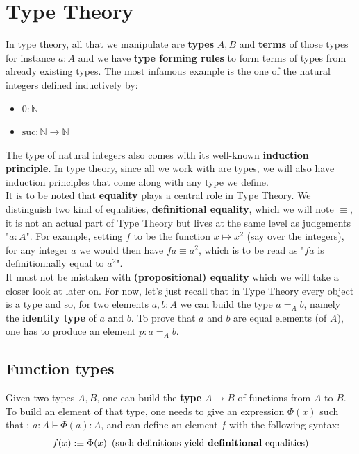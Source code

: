 \documentclass{report}
\begin{document}
\section{Type Theory}
In type theory, all that we manipulate are \textbf{types} $A,B$ and \textbf{terms} of those types for instance $a : A$ and we have \textbf{type forming rules} to form terms of types from already existing types. The most infamous example is the one of the natural integers defined inductively by:
\begin{itemize}
    \item $0 : \mathbb N$
    \item $\mathrm{suc}: \mathbb N \rightarrow \mathbb N$
\end{itemize}
The type of natural integers also comes with its well-known \textbf{induction principle}. In type theory, since all we work with are types, we will also have induction principles that come along with any type we define.\\
It is to be noted that \textbf{equality} plays a central role in Type Theory. We distinguish two kind of equalities, \textbf{definitional equality}, which we will note $\equiv$, it is not an actual part of Type Theory but lives at the same level as judgements "$a : A $". For example, setting $f$ to be the function $x \mapsto x^2 $ (say over the integers), for any integer $a$ we would then have $f a \equiv a^2$, which is to be read as "$f a$ is definitionnally equal to $a^2$".\\
It must not be mistaken with \textbf{(propositional) equality} which we will take a closer look at later on. For now, let's just recall that in Type Theory every object is a type and so, for two elements $a,b :A$ we can build the type $a =_A b$, namely the \textbf{identity type} of $a$ and $b$. To prove that $a$ and $b$ are equal elements (of $A$), one has to produce an element $p : a=_A b$.
\subsection{Function types}
Given two types $A,B$, one can build the \textbf{type} $A \rightarrow B$ of functions from $A$ to $B$. To build an element of that type, one needs to give an expression $\Phi(x)$ such that : $a : A \vdash \Phi(a) : A$, and can define an element $f$ with the following syntax: 
$$f(x) :\equiv \Phi(x) \hspace{5pt}\text{(such definitions yield \textbf{definitional} equalities)}$$
\end{document}

